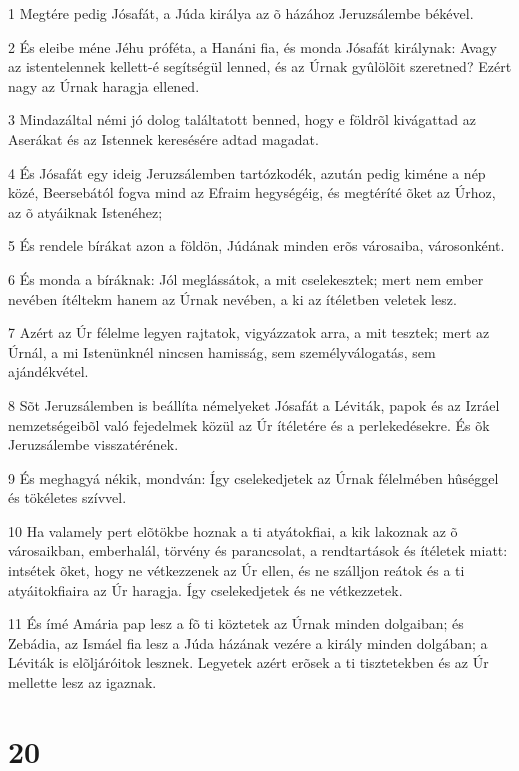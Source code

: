 \par 1 Megtére pedig Jósafát, a Júda királya az õ házához Jeruzsálembe békével.
\par 2 És eleibe méne Jéhu próféta, a Hanáni fia, és monda Jósafát királynak: Avagy az istentelennek kellett-é segítségül lenned, és az Úrnak gyûlölõit szeretned? Ezért nagy az Úrnak haragja ellened.
\par 3 Mindazáltal némi jó dolog találtatott benned, hogy e földrõl kivágattad az Aserákat és az Istennek keresésére adtad magadat.
\par 4 És Jósafát egy ideig Jeruzsálemben tartózkodék, azután pedig kiméne a nép közé, Beersebától fogva mind az Efraim hegységéig, és megtéríté õket az Úrhoz, az õ atyáiknak Istenéhez;
\par 5 És rendele bírákat azon a földön, Júdának minden erõs városaiba, városonként.
\par 6 És monda a bíráknak: Jól meglássátok, a mit cselekesztek; mert nem ember nevében ítéltekm hanem az Úrnak nevében, a ki az ítéletben veletek lesz.
\par 7 Azért az Úr félelme legyen rajtatok, vigyázzatok arra, a mit tesztek; mert az Úrnál, a mi Istenünknél nincsen hamisság, sem személyválogatás, sem ajándékvétel.
\par 8 Sõt Jeruzsálemben is beállíta némelyeket Jósafát a Léviták, papok és az Izráel nemzetségeibõl való fejedelmek közül az Úr ítéletére és a perlekedésekre. És õk Jeruzsálembe visszatérének.
\par 9 És meghagyá nékik, mondván: Így cselekedjetek az Úrnak félelmében hûséggel és tökéletes szívvel.
\par 10 Ha valamely pert elõtökbe hoznak a ti atyátokfiai, a kik lakoznak az õ városaikban, emberhalál, törvény és parancsolat, a rendtartások és ítéletek miatt: intsétek õket, hogy ne vétkezzenek az Úr ellen, és ne szálljon reátok és a ti atyáitokfiaira az Úr haragja. Így cselekedjetek és ne vétkezzetek.
\par 11 És ímé Amária pap lesz a fõ ti köztetek az Úrnak minden dolgaiban; és Zebádia, az Ismáel fia lesz a Júda házának vezére a király minden dolgában; a Léviták is elõljáróitok lesznek. Legyetek azért erõsek a ti tisztetekben és az Úr mellette lesz az igaznak.

\chapter{20}

